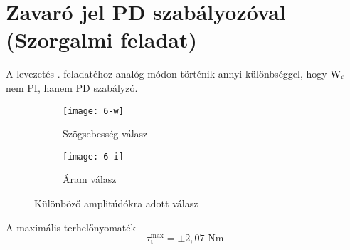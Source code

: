 \section{Zavaró jel PD szabályozóval (Szorgalmi feladat)}

A levezetés . feladatéhoz analóg módon történik annyi különbséggel, hogy
$\mathrm{W}_\text{c}$ nem PI, hanem PD szabályzó.

\begin{figure}[H]
	\centering
	\begin{subfigure}{.49\textwidth}
		\texttt{[image: 6-w]}
		\caption{Szögsebesség válasz}
	\end{subfigure}
	\begin{subfigure}{.49\textwidth}
		\texttt{[image: 6-i]}
		\caption{Áram válasz}
	\end{subfigure}
	\caption{Különböző amplitúdókra adott válasz}
	\label{fig:szorg2}
\end{figure}

A maximális terhelőnyomaték
\begin{equation}
	\tau_\text{t}^\text{max} = \pm2,07\text{ Nm}
\end{equation}
